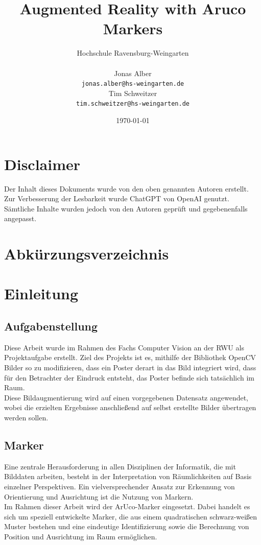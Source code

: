 \documentclass[a4paper,twocolumn]{article}
\title{Augmented Reality with Aruco Markers}
\author{
    Hochschule Ravensburg-Weingarten \\[1em] %
    \begin{minipage}[t]{0.45\textwidth} %
        \centering
        Jonas Alber \\ %
        \texttt{jonas.alber@hs-weingarten.de} %
    \end{minipage}
    \hfill
    \begin{minipage}[t]{0.45\textwidth} %
        \centering
        Tim Schweitzer \\ %
        \texttt{tim.schweitzer@hs-weingarten.de} %
    \end{minipage}
}
\date{\today}
\begin{document}
\maketitle

\section*{Disclaimer}

Der Inhalt dieses Dokuments wurde von den oben genannten Autoren erstellt. Zur Verbesserung der Lesbarkeit wurde ChatGPT von OpenAI genutzt. Sämtliche Inhalte wurden jedoch von den Autoren geprüft und gegebenenfalls angepasst.


\section*{Abkürzungsverzeichnis}
\begin{acronym}[RWU]
\end{acronym}

\begin{abstract}

\end{abstract}

\section{Einleitung}

\subsection{Aufgabenstellung}
Diese Arbeit wurde im Rahmen des Fachs Computer Vision an der \ac{RWU} als Projektaufgabe erstellt. Ziel des Projekts ist es, mithilfe der Bibliothek OpenCV Bilder so zu modifizieren, dass ein Poster derart in das Bild integriert wird, dass für den Betrachter der Eindruck entsteht, das Poster befinde sich tatsächlich im Raum.
\\
Diese Bildaugmentierung wird auf einen vorgegebenen Datensatz angewendet, wobei die erzielten Ergebnisse anschließend auf selbst erstellte Bilder übertragen werden sollen.

\subsection{Marker}
Eine zentrale Herausforderung in allen Disziplinen der Informatik, die mit Bilddaten arbeiten, besteht in der Interpretation von Räumlichkeiten auf Basis einzelner Perspektiven. Ein vielversprechender Ansatz zur Erkennung von Orientierung und Ausrichtung ist die Nutzung von Markern.
\\
Im Rahmen dieser Arbeit wird der ArUco-Marker eingesetzt. Dabei handelt es sich um speziell entwickelte Marker, die aus einem quadratischen schwarz-weißen Muster bestehen und eine eindeutige Identifizierung sowie die Berechnung von Position und Ausrichtung im Raum ermöglichen.
\end{document}
